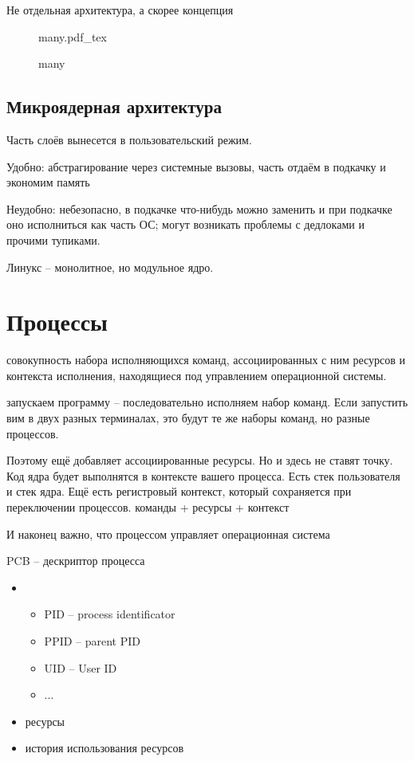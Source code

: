 \documentclass{book}
\theoremstyle{definition}
\newcommand{\incfig}[1]{%
    \def\svgwidth{\columnwidth}
    {#1.pdf_tex}
}
\begin{document}
    Не отдельная архитектура, а скорее концепция

\begin{figure}[!ht]
    \centering
    \incfig{many}
    \caption{many}
    \label{fig:many}
\end{figure}

\subsection{Микроядерная архитектура}

Часть слоёв вынесется в пользовательский режим.

Удобно: абстрагирование через системные вызовы, часть отдаём в подкачку и экономим память

Неудобно: небезопасно, в подкачке что-нибудь можно заменить и при подкачке оно исполниться как часть ОС; могут возникать проблемы с дедлоками и прочими тупиками.

Линукс -- монолитное, но модульное ядро. 

\section{Процессы}
\begin{definition}
    совокупность набора исполняющихся команд, ассоциированных с ним ресурсов и контекста исполнения, находящиеся под управлением операционной системы.

    запускаем программу -- последовательно исполняем набор команд. Если запустить вим в двух разных терминалах, это будут те же наборы команд, но разные процессов.

    Поэтому ещё добавляет ассоциированные ресурсы. Но и здесь не ставят точку. Код ядра будет выполнятся в контексте вашего процесса. Есть стек пользователя и стек ядра. Ещё есть регистровый контекст, который сохраняется при переключении процессов. команды + ресурсы + контекст

    И наконец важно, что процессом управляет операционная система
\end{definition}

PCB -- дескриптор процесса
\begin{itemize}
    \item 
    \begin{itemize}
        \item PID -- process identificator
        \item PPID -- parent PID
        \item UID -- User ID
        \item ...
    \end{itemize}
    \item ресурсы
    \item история использования ресурсов
\end{itemize}
\end{document}
